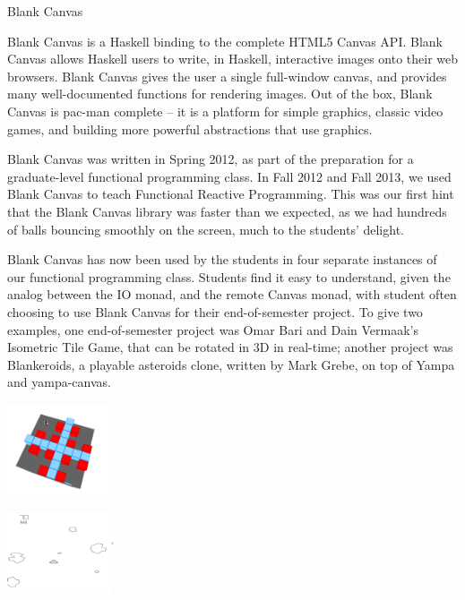 \begin{hcarentry}{Blank Canvas}
\label{BlankCanvas}
\makeheader

Blank Canvas is a Haskell binding to the complete HTML5 Canvas API.
Blank Canvas allows Haskell users to write, in Haskell, interactive images
onto their web browsers. Blank Canvas gives the user a single full-window
canvas, and provides many well-documented functions for rendering images.
Out of the box,
Blank Canvas is pac-man complete -- it is a platform
for simple graphics, classic video games,
and building more powerful abstractions that use graphics.

Blank Canvas was written in Spring 2012, as part of the
preparation for a graduate-level
functional programming class. 
In Fall 2012 and Fall 2013, we used Blank Canvas to teach Functional Reactive Programming.
This was our first hint that the Blank Canvas library was faster than we expected,
as we had hundreds of balls bouncing smoothly on the screen, much to the students' delight. 

Blank Canvas has now been used by the students in four separate
instances of our functional programming class. Students find it easy
to understand, given the analog between the IO monad, and the remote
Canvas monad,
%
with student often choosing to use Blank Canvas for their end-of-semester project. 
To give two examples,
one end-of-semester project was
%
Omar Bari and Dain Vermaak's Isometric Tile Game, that can 
be rotated in 3D in real-time;
%
another project was Blankeroids, a playable asteroids clone,
written by Mark Grebe, on top of Yampa and yampa-canvas.
%

\begin{center}
\includegraphics[width=0.235\textwidth]{html/Isometric_Omar_Bari.png}
\end{center}

\begin{center}
\includegraphics[width=0.235\textwidth]{html/Blankeroids_Mark_Grebe.png}
\end{center}


\end{hcarentry}
